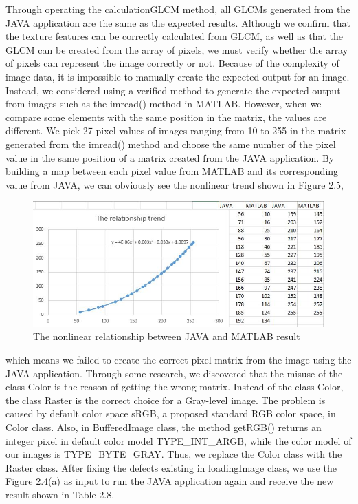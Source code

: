 Through operating the calculationGLCM method, all GLCMs generated from the JAVA application are the same as the expected results. 
Although we confirm that the texture features can be correctly calculated from GLCM, as well as that the GLCM can be created from the array of pixels, we must verify whether the array of pixels can represent the image correctly or not. Because of the complexity of image data, it is impossible to manually create the expected output for an image. Instead, we considered using a verified method to generate the expected output from images such as the imread() method in MATLAB. However, when we compare some elements with the same position in the matrix, the values are different. We pick 27-pixel values of images ranging from 10 to 255 in the matrix generated from the imread() method and choose the same number of the pixel value in the same position of a matrix created from the JAVA application. By building a map between each pixel value from MATLAB and its corresponding value from JAVA, we can obviously see the nonlinear trend shown in Figure 2.5, 
\begin{figure}[!h]
\includegraphics[width = \linewidth]{rgb_statistical}
\caption{The nonlinear relationship between JAVA and MATLAB result}
\end{figure}
which means we failed to create the correct pixel matrix from the image using the JAVA application. Through some research, we discovered that the misuse of the class Color is the reason of getting the wrong matrix. Instead of the class Color, the class Raster is the correct choice for a Gray-level image. The problem is caused by default color space sRGB, a proposed standard RGB color space, in Color class. Also, in BufferedImage class, the method getRGB() returns an integer pixel in default color model TYPE\_INT\_ARGB, while the color model of our images is TYPE\_BYTE\_GRAY. Thus, we replace the Color class with the Raster class. After fixing the defects existing in loadingImage class, we use the Figure 2.4(a) as input to run the JAVA application again and receive the new result shown in Table 2.8. 
